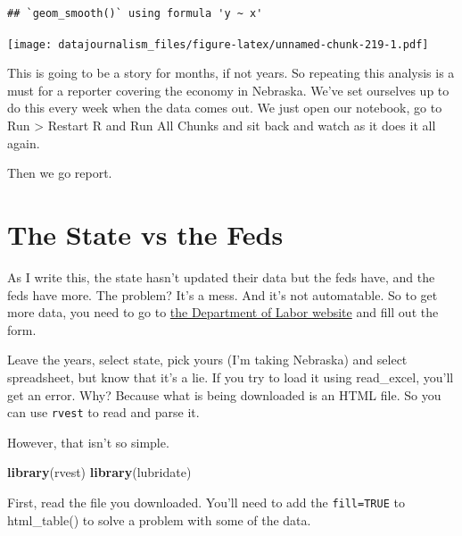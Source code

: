\documentclass[]{book}
\newenvironment{Shaded}{\begin{snugshade}}{\end{snugshade}}
\newcommand{\DataTypeTok}[1]{\textcolor[rgb]{0.13,0.29,0.53}{#1}}
\newcommand{\KeywordTok}[1]{\textcolor[rgb]{0.13,0.29,0.53}{\textbf{#1}}}
\newcommand{\NormalTok}[1]{#1}
\newcommand{\OperatorTok}[1]{\textcolor[rgb]{0.81,0.36,0.00}{\textbf{#1}}}
\newcommand{\OtherTok}[1]{\textcolor[rgb]{0.56,0.35,0.01}{#1}}
\newcommand{\StringTok}[1]{\textcolor[rgb]{0.31,0.60,0.02}{#1}}
\begin{document}
\begin{verbatim}
## `geom_smooth()` using formula 'y ~ x'
\end{verbatim}

\texttt{[image: datajournalism\_files/figure-latex/unnamed-chunk-219-1.pdf]}

This is going to be a story for months, if not years. So repeating this analysis is a must for a reporter covering the economy in Nebraska. We've set ourselves up to do this every week when the data comes out. We just open our notebook, go to Run \textgreater{} Restart R and Run All Chunks and sit back and watch as it does it all again.

Then we go report.

\hypertarget{the-state-vs-the-feds}{%
\section{The State vs the Feds}\label{the-state-vs-the-feds}}

As I write this, the state hasn't updated their data but the feds have, and the feds have more. The problem? It's a mess. And it's not automatable. So to get more data, you need to go to \href{https://oui.doleta.gov/unemploy/claims.asp}{the Department of Labor website} and fill out the form.

Leave the years, select state, pick yours (I'm taking Nebraska) and select spreadsheet, but know that it's a lie. If you try to load it using read\_excel, you'll get an error. Why? Because what is being downloaded is an HTML file. So you can use \texttt{rvest} to read and parse it.

However, that isn't so simple.

\begin{Shaded}
\begin{Highlighting}[]
\KeywordTok{library}\NormalTok{(rvest)}
\KeywordTok{library}\NormalTok{(lubridate)}
\end{Highlighting}
\end{Shaded}

First, read the file you downloaded. You'll need to add the \texttt{fill=TRUE} to html\_table() to solve a problem with some of the data.

\begin{Shaded}
\end{Shaded}
\end{document}
